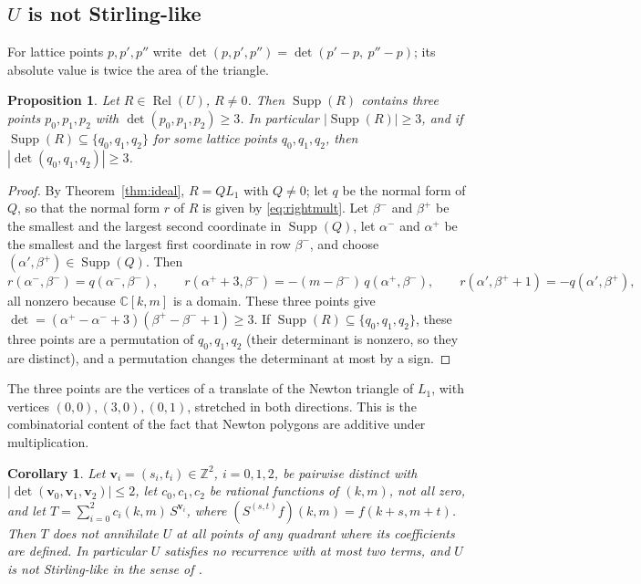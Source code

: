 \documentclass[11pt]{amsart}
\newtheorem{proposition}[theorem]{Proposition}
\newtheorem{corollary}[theorem]{Corollary}
\theoremstyle{definition}
\newcommand{\C}{\mathbb{C}}
\newcommand{\Z}{\mathbb{Z}}
\DeclareMathOperator{\Rel}{Rel}
\DeclareMathOperator{\Supp}{Supp}
\begin{document}
\subsection{\texorpdfstring{$U$}{U} is not Stirling-like}
For lattice points $p,p',p''$ write $\det(p,p',p'')=\det(p'-p,\ p''-p)$; its absolute value is twice the area of the triangle.

\begin{proposition}\label{prop:triangle}
Let $R\in\Rel(U)$, $R\ne0$. Then $\Supp(R)$ contains three points $p_0,p_1,p_2$ with $\det(p_0,p_1,p_2)\ge3$. In particular $|\Supp(R)|\ge3$, and if $\Supp(R)\subseteq\{q_0,q_1,q_2\}$ for some lattice points $q_0,q_1,q_2$, then $|\det(q_0,q_1,q_2)|\ge3$.
\end{proposition}

\begin{proof}
By Theorem~\ref{thm:ideal}, $R=QL_1$ with $Q\ne0$; let $q$ be the normal form of $Q$, so that the normal form $r$ of $R$ is given by \eqref{eq:rightmult}. Let $\beta^-$ and $\beta^+$ be the smallest and the largest second coordinate in $\Supp(Q)$, let $\alpha^-$ and $\alpha^+$ be the smallest and the largest first coordinate in row $\beta^-$, and choose $(\alpha',\beta^+)\in\Supp(Q)$. Then
\[
  r(\alpha^-,\beta^-)=q(\alpha^-,\beta^-),\qquad r(\alpha^++3,\beta^-)=-(m-\beta^-)\,q(\alpha^+,\beta^-),\qquad r(\alpha',\beta^++1)=-q(\alpha',\beta^+),
\]
all nonzero because $\C[k,m]$ is a domain. These three points give $\det=(\alpha^+-\alpha^-+3)(\beta^+-\beta^-+1)\ge3$. If $\Supp(R)\subseteq\{q_0,q_1,q_2\}$, these three points are a permutation of $q_0,q_1,q_2$ (their determinant is nonzero, so they are distinct), and a permutation changes the determinant at most by a sign.
\end{proof}

The three points are the vertices of a translate of the Newton triangle of $L_1$, with vertices $(0,0),(3,0),(0,1)$, stretched in both directions. This is the combinatorial content of the fact that Newton polygons are additive under multiplication.

\begin{corollary}\label{cor:stirlinglike}
Let $\mathbf v_i=(s_i,t_i)\in\Z^2$, $i=0,1,2$, be pairwise distinct with $|\det(\mathbf v_0,\mathbf v_1,\mathbf v_2)|\le2$, let $c_0,c_1,c_2$ be rational functions of $(k,m)$, not all zero, and let $T=\sum_{i=0}^{2}c_i(k,m)\,S^{\mathbf v_i}$, where $(S^{(s,t)}f)(k,m)=f(k+s,m+t)$. Then $T$ does not annihilate $U$ at all points of any quadrant where its coefficients are defined. In particular $U$ satisfies no recurrence with at most two terms, and $U$ is not Stirling-like in the sense of \cite[Definition~3]{Kauers07}.
\end{corollary}
\end{document}
